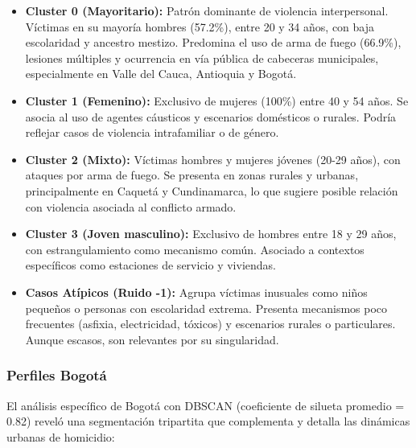 \documentclass[lettersize,journal]{IEEEtran}
\begin{document}
\begin{itemize}
    \item \textbf{Cluster 0 (Mayoritario):} Patrón dominante de violencia interpersonal. Víctimas en su mayoría hombres (57.2\%), entre 20 y 34 años, con baja escolaridad y ancestro mestizo. Predomina el uso de arma de fuego (66.9\%), lesiones múltiples y ocurrencia en vía pública de cabeceras municipales, especialmente en Valle del Cauca, Antioquia y Bogotá.

    \item \textbf{Cluster 1 (Femenino):} Exclusivo de mujeres (100\%) entre 40 y 54 años. Se asocia al uso de agentes cáusticos y escenarios domésticos o rurales. Podría reflejar casos de violencia intrafamiliar o de género.

    \item \textbf{Cluster 2 (Mixto):} Víctimas hombres y mujeres jóvenes (20-29 años), con ataques por arma de fuego. Se presenta en zonas rurales y urbanas, principalmente en Caquetá y Cundinamarca, lo que sugiere posible relación con violencia asociada al conflicto armado.

    \item \textbf{Cluster 3 (Joven masculino):} Exclusivo de hombres entre 18 y 29 años, con estrangulamiento como mecanismo común. Asociado a contextos específicos como estaciones de servicio y viviendas.

    \item \textbf{Casos Atípicos (Ruido -1):} Agrupa víctimas inusuales como niños pequeños o personas con escolaridad extrema. Presenta mecanismos poco frecuentes (asfixia, electricidad, tóxicos) y escenarios rurales o particulares. Aunque escasos, son relevantes por su singularidad.
\end{itemize}



\subsubsection{Perfiles Bogotá}

El análisis específico de Bogotá con DBSCAN (coeficiente de silueta promedio = 0.82) reveló una segmentación tripartita que complementa y detalla las dinámicas urbanas de homicidio:
\end{document}
